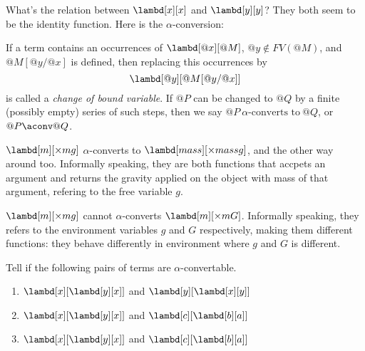 \documentclass[../../../include/open-logic-section]{subfiles}
\begin{document}

What's the relation between $\lambd[x][x]$ and $\lambd[y][y]$? They
both seem to be the identity function. Here is the $\alpha$-conversion:

\begin{defn}
  If a term contains an occurrences of $\lambd[@x][@M]$, $@y \notin
  FV(@M)$, and $@M[@y/@x]$ is defined, then replacing this occurrences
  by 
  \begin{equation*}
    \lambd[@y][@M[@y/@x]]
  \end{equation*}
  is called a \emph{change of bound
    variable}. If $@P$ can be changed to $@Q$ by a finite (possibly
  empty) series of such steps, then we say $@P ~\alpha\text{-converts to}~ @Q$,
  or $@P \aconv @Q$.
\end{defn}

\begin{ex}
  $\lambd[m][\times m g]$ $\alpha$-converts to $\lambd[mass][\times mass
  g]$, and the other way around too. Informally
  speaking, they are both functions that accpets an argument and
  returns the gravity applied on the object with mass of that argument,
  refering to the free variable $g$.
\end{ex}
\begin{ex}
  $\lambd[m][\times m g]$ cannot $\alpha$-converts $\lambd[m][\times m
  G]$. Informally speaking, they refers to the environment variables $g$ and $G$ respectively,
  making them different functions: they behave differently in
  environment where $g$ and $G$ is different.
\end{ex}

\begin{prob}
  Tell if the following pairs of terms are $\alpha$-convertable.
  \begin{enumerate}
  \item $\lambd[x][\lambd[y][x]]$ and $\lambd[y][\lambd[x][y]]$
  \item $\lambd[x][\lambd[y][x]]$ and $\lambd[c][\lambd[b][a]]$
  \item $\lambd[x][\lambd[y][x]]$ and $\lambd[c][\lambd[b][a]]$
  \end{enumerate}
\end{prob}
\end{document}

